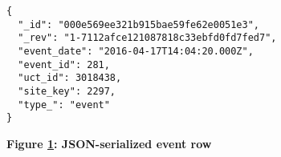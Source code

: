 \begin{figure}[H]
  \centering
  \begin{mdframed}
    \centering
    \begin{verbatim}
{
  "_id": "000e569ee321b915bae59fe62e0051e3",
  "_rev": "1-7112afce121087818c33ebfd0fd7fed7",
  "event_date": "2016-04-17T14:04:20.000Z",
  "event_id": 281,
  "uct_id": 3018438,
  "site_key": 2297,
  "type_": "event"
}           
        \end{verbatim}
  \end{mdframed}
  \caption[JSON-serialized event row]{\textbf{Figure \ref{fig-json-event}: JSON-serialized event row}}
  \label{fig-json-event}
\end{figure}
